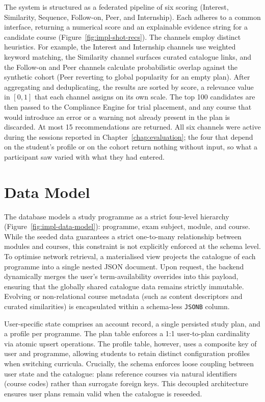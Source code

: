 The system is structured as a federated pipeline of six scoring  (Interest, Similarity, Sequence, Follow-on, Peer, and Internship). Each adheres to a common interface, returning a numerical score and an explainable evidence string for a candidate course (Figure~\ref{fig:impl-shot-recs}). The channels employ distinct heuristics. For example, the Interest and Internship channels use weighted keyword matching, the Similarity channel surfaces curated catalogue links, and the Follow-on and Peer channels calculate probabilistic overlap against the synthetic cohort (Peer reverting to global popularity for an empty plan). After aggregating and deduplicating, the results are sorted by score, a relevance value in $[0,1]$ that each channel assigns on its own scale. The top 100 candidates are then passed to the Compliance Engine for trial placement, and any course that would introduce an error or a warning not already present in the plan is discarded. At most 15 recommendations are returned.
All six channels were active during the sessions reported in Chapter~\ref{chap:evaluation}; the four that depend on the student's profile or on the cohort return nothing without input, so what a participant saw varied with what they had entered.

\section{Data Model}
\label{sec:impl-data}

The database models a study programme as a strict four-level hierarchy (Figure~\ref{fig:impl-data-model}): programme, exam subject, module, and course. While the seeded data guarantees a strict one-to-many relationship between modules and courses, this constraint is not explicitly enforced at the schema level. To optimise network retrieval, a materialised view projects the catalogue of each programme into a single nested JSON document. Upon request, the backend dynamically merges the user's term-availability overrides into this payload, ensuring that the globally shared catalogue data remains strictly immutable. Evolving or non-relational course metadata (such as content descriptors and curated similarities) is encapsulated within a schema-less \texttt{JSONB} column.

User-specific state comprises an account record, a single persisted study plan, and a profile per programme. The plan table enforces a 1:1 user-to-plan cardinality via atomic upsert operations. The profile table, however, uses a composite key of user and programme, allowing students to retain distinct configuration profiles when switching curricula. Crucially, the schema enforces loose coupling between user state and the catalogue: plans reference courses via natural identifiers (course codes) rather than surrogate foreign keys. This decoupled architecture ensures user plans remain valid when the catalogue is reseeded.

